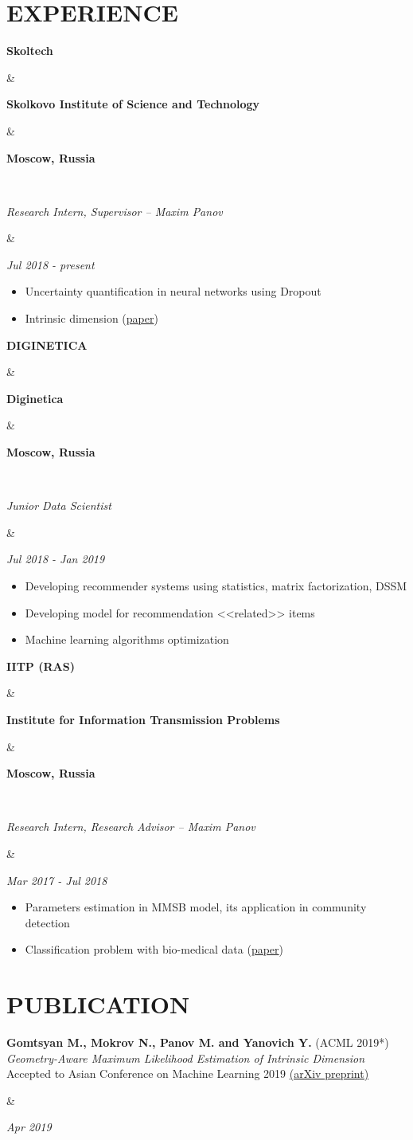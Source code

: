 \documentclass[11pt,a4paper,roman]{moderncv}
\newcommand{\logoSk}{\textcolor{sk_gray}{Skol}\textcolor{sk_green}{tech}}
\newcommand{\logoDigi}{\textcolor{digi_red}{DIGI}NETICA}
\newcommand{\logoIITP}{\textcolor{iitp_blue}{IITP (RAS)}}
\newcommand*{\cvarticle}[7]{
    \parbox[t]{0.90\textwidth}{
    \textcolor{graycv}{\bfseries #2} ({\ithsape #3})\\
	{\itshape #4} \\
	{\footnotesize #5} \href{#6}{(#7)}\vspace{\parsep}
    }&\parbox[t]{0.10\textwidth}{
    \hfill {\itshape #1}}
}
\newcommand*{\cvpublic}[5]{
    \parbox[t]{0.22\textwidth}{\bfseries #1}
    &\parbox[t]{0.56\textwidth}{\centering \bfseries #2}
    &\parbox[t]{0.22\textwidth}{\hfill {\bfseries #3}}
    \\ \parbox[t]{0.78\textwidth}{\itshape #4}
    &\parbox[t]{0.22\textwidth}{\hfill {\itshape #5}}
}
\begin{document}
\section{EXPERIENCE}
{\cvpublic{\logoSk}
          {Skolkovo Institute of Science and Technology}
          {Moscow, Russia}
          {Research Intern, Supervisor -- Maxim Panov}
          {Jul 2018 - present}
    {\begin{itemize}
        \item Uncertainty quantification in neural networks using Dropout
        \item Intrinsic dimension (\href{https://arxiv.org/abs/1904.06151}{paper})
    \end{itemize}}
 \vspace{5}}
 
{\cvpublic{\logoDigi}
          {Diginetica}
          {Moscow, Russia}
          {Junior Data Scientist}
          {Jul 2018 - Jan 2019}
    {\begin{itemize}
        \item Developing recommender systems using statistics, matrix factorization, DSSM
        \item Developing model for recommendation <<related>> items 
        \item Machine learning algorithms optimization
    \end{itemize}}
\vspace{5}}

{\cvpublic{\logoIITP}
          {Institute for Information Transmission Problems}
          {Moscow, Russia}
          {Research Intern, Research Advisor -- Maxim Panov}
          {Mar 2017 - Jul 2018}
    {\begin{itemize}
        \item Parameters estimation in MMSB model, its application in community detection
        \item Classification problem with bio-medical data (\href{https://arxiv.org/pdf/1710.05213.pdf}{paper})
    \end{itemize}}
}

\section{PUBLICATION}

{\cvarticle{Apr 2019}
           {Gomtsyan M., Mokrov N., Panov M. and Yanovich Y.}
           {ACML 2019*}
           {Geometry-Aware Maximum Likelihood Estimation of Intrinsic Dimension}
           {Accepted to Asian Conference on Machine Learning 2019}
           {https://arxiv.org/abs/1904.06151}
           {arXiv preprint}}
\end{document}
